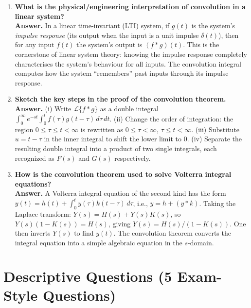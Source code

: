 \documentclass[12pt,a4paper]{article}
\begin{document}
\begin{enumerate}[label=\textbf{Q\arabic*.}, leftmargin=*, itemsep=10pt]
\item \textbf{What is the physical/engineering interpretation of convolution in a linear system?}\\
\textbf{Answer.} In a linear time-invariant (LTI) system, if $g(t)$ is the system's
\emph{impulse response} (its output when the input is a unit impulse $\delta(t)$), then
for any input $f(t)$ the system's output is $(f*g)(t)$. This is the cornerstone of
linear system theory: knowing the impulse response completely characterises the system's
behaviour for all inputs. The convolution integral computes how the system ``remembers''
past inputs through its impulse response.

\item \textbf{Sketch the key steps in the proof of the convolution theorem.}\\
\textbf{Answer.}
(i) Write $\mathcal{L}\{f*g\}$ as a double integral
    $\int_0^\infty e^{-st}\!\int_0^t f(\tau)g(t-\tau)\,d\tau\,dt$.
(ii) Change the order of integration: the region $0\le\tau\le t<\infty$ is rewritten as
    $0\le\tau<\infty$, $\tau\le t<\infty$.
(iii) Substitute $u=t-\tau$ in the inner integral to shift the lower limit to 0.
(iv) Separate the resulting double integral into a product of two single integrals,
    each recognized as $F(s)$ and $G(s)$ respectively.

\item \textbf{How is the convolution theorem used to solve Volterra integral equations?}\\
\textbf{Answer.} A Volterra integral equation of the second kind has the form
$y(t)=h(t)+\int_0^t y(\tau)k(t-\tau)\,d\tau$, i.e., $y=h+(y*k)$.
Taking the Laplace transform: $Y(s)=H(s)+Y(s)K(s)$, so $Y(s)(1-K(s))=H(s)$,
giving $Y(s)=H(s)/(1-K(s))$. One then inverts $Y(s)$ to find $y(t)$.
The convolution theorem converts the integral equation into a simple algebraic equation
in the $s$-domain.

\end{enumerate}

\section{Descriptive Questions (5 Exam-Style Questions)}
\end{document}
